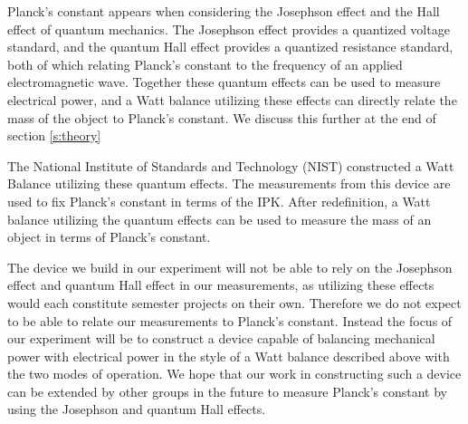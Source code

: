 \documentclass[aps,prstab,reprint,12pt]{revtex4-1}
\begin{document}
Planck's constant appears when considering the Josephson effect and the Hall effect of quantum mechanics. The Josephson effect provides a quantized voltage standard, and the quantum Hall effect provides a quantized resistance standard, both of which relating Planck's constant to the frequency of an applied electromagnetic wave. Together these quantum effects can be used to measure electrical power, and a Watt balance utilizing these effects can directly relate the mass of the object to Planck's constant. We discuss this further at the end of section \ref{s:theory}





The National Institute of Standards and Technology (NIST) constructed a Watt Balance utilizing these quantum effects. The measurements from this device are used to fix Planck's constant in terms of the IPK. After redefinition, a Watt balance utilizing the quantum effects can be used to measure the mass of an object in terms of Planck's constant.

The device we build in our experiment will not be able to rely on the Josephson effect and quantum Hall effect in our measurements, as utilizing these effects would each constitute semester projects on their own. Therefore we do not expect to be able to relate our measurements to Planck's constant. Instead the focus of our experiment will be to construct a device capable of balancing mechanical power with electrical power in the style of a Watt balance described above with the two modes of operation. We hope that our work in constructing such a device can be extended by other groups in the future to measure Planck's constant by using the Josephson and quantum Hall effects.
\end{document}
